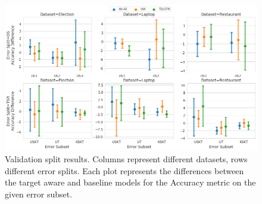 \begin{figure}[!h]
    \centering
    \includegraphics[scale=0.3]{images/augmentation/methods_performance/Inter_Target/inter_target_encoding_split_overall_diff_validation.png}
    \caption{Validation split results. Columns represent different datasets, rows different error splits. Each plot represents the differences between the target aware and baseline models for the Accuracy metric on the given error subset.}
    \label{fig:aug_inter_target_encoding_split_overall_diff_validation}
\end{figure}
